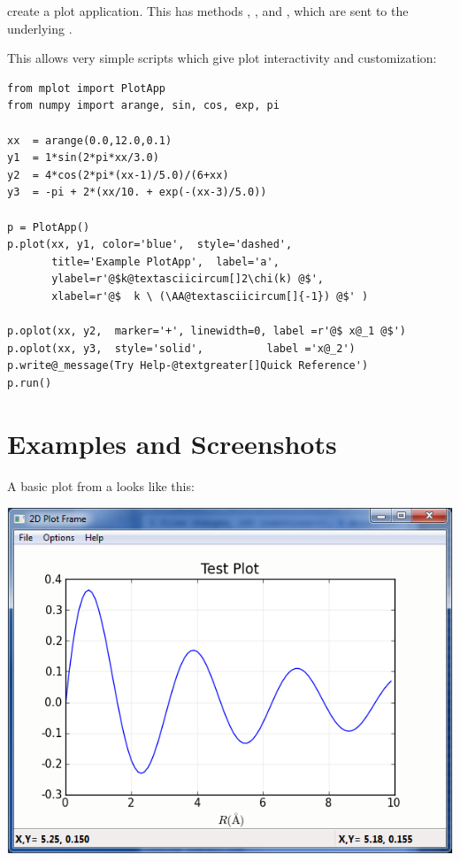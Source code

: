 \documentclass[letterpaper,10pt,english]{sphinxmanual}
\begin{document}

\begin{fulllineitems}
\label{plotpanel:PlotAppp}
create a plot application.  This has methods {\hyperref[plotpanel:plot]{}}, {\hyperref[plotpanel:oplot]{}}, and
{\hyperref[plotpanel:write_message]{}}, which are sent to the underlying {\hyperref[plotpanel:PlotPanel]{}}.

This allows very simple scripts which give plot interactivity and
customization:

\begin{Verbatim}[commandchars=@\[\]]
from mplot import PlotApp
from numpy import arange, sin, cos, exp, pi

xx  = arange(0.0,12.0,0.1)
y1  = 1*sin(2*pi*xx/3.0)
y2  = 4*cos(2*pi*(xx-1)/5.0)/(6+xx)
y3  = -pi + 2*(xx/10. + exp(-(xx-3)/5.0))

p = PlotApp()
p.plot(xx, y1, color='blue',  style='dashed',
       title='Example PlotApp',  label='a',
       ylabel=r'@$k@textasciicircum[]2\chi(k) @$',
       xlabel=r'@$  k \ (\AA@textasciicircum[]{-1}) @$' )

p.oplot(xx, y2,  marker='+', linewidth=0, label =r'@$ x@_1 @$')
p.oplot(xx, y3,  style='solid',          label ='x@_2')
p.write@_message(Try Help-@textgreater[]Quick Reference')
p.run()
\end{Verbatim}

\end{fulllineitems}



\section{Examples and Screenshots}
\label{plotpanel:examples-and-screenshots}
A basic plot from a {\hyperref[plotpanel:PlotFrame]{}} looks like this:

\includegraphics{basic_screenshot.png}
\end{document}
